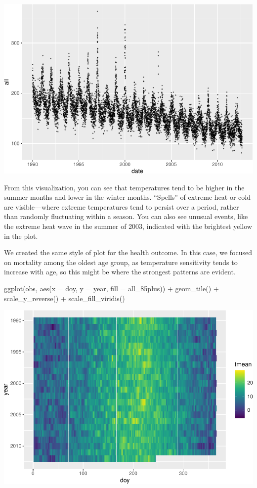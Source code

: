 \documentclass[
]{book}
\newenvironment{Shaded}{\begin{snugshade}}{\end{snugshade}}
\newcommand{\AttributeTok}[1]{\textcolor[rgb]{0.77,0.63,0.00}{#1}}
\newcommand{\FunctionTok}[1]{\textcolor[rgb]{0.00,0.00,0.00}{#1}}
\newcommand{\NormalTok}[1]{#1}
\newcommand{\SpecialCharTok}[1]{\textcolor[rgb]{0.00,0.00,0.00}{#1}}
\begin{document}
\includegraphics{adv_epi_analysis_files/figure-latex/unnamed-chunk-11-1.pdf}

From this visualization, you can see that temperatures tend to be higher in the
summer months and lower in the winter months. ``Spells'' of extreme heat or cold
are visible---where extreme temperatures tend to persist over a period, rather
than randomly fluctuating within a season. You can also see unusual events, like
the extreme heat wave in the summer of 2003, indicated with the brightest
yellow in the plot.

We created the same style of plot for the health outcome. In this case, we
focused on mortality among the oldest age group, as temperature sensitivity
tends to increase with age, so this might be where the strongest patterns are
evident.

\begin{Shaded}
\begin{Highlighting}[]
\FunctionTok{ggplot}\NormalTok{(obs, }\FunctionTok{aes}\NormalTok{(}\AttributeTok{x =}\NormalTok{ doy, }\AttributeTok{y =}\NormalTok{ year, }\AttributeTok{fill =}\NormalTok{ all\_85plus)) }\SpecialCharTok{+} 
  \FunctionTok{geom\_tile}\NormalTok{() }\SpecialCharTok{+}
  \FunctionTok{scale\_y\_reverse}\NormalTok{() }\SpecialCharTok{+} 
  \FunctionTok{scale\_fill\_viridis}\NormalTok{()}
\end{Highlighting}
\end{Shaded}

\includegraphics{adv_epi_analysis_files/figure-latex/unnamed-chunk-12-1.pdf}
\end{document}
